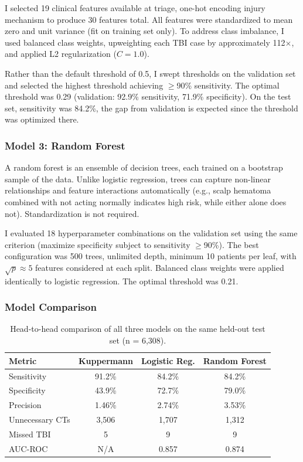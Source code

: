 \documentclass[11pt,letterpaper]{article}
\begin{document}
I selected 19 clinical features available at triage, one-hot encoding injury mechanism to produce 30 features total. All features were standardized to mean zero and unit variance (fit on training set only). To address class imbalance, I used balanced class weights, upweighting each TBI case by approximately 112$\times$, and applied L2 regularization ($C = 1.0$).

Rather than the default threshold of 0.5, I swept thresholds on the validation set and selected the highest threshold achieving $\geq$90\% sensitivity. The optimal threshold was 0.29 (validation: 92.9\% sensitivity, 71.9\% specificity). On the test set, sensitivity was 84.2\%, the gap from validation is expected since the threshold was optimized there.

\subsubsection{Model 3: Random Forest}

A random forest is an ensemble of decision trees, each trained on a bootstrap sample of the data. Unlike logistic regression, trees can capture non-linear relationships and feature interactions automatically (e.g., scalp hematoma combined with not acting normally indicates high risk, while either alone does not). Standardization is not required.

I evaluated 18 hyperparameter combinations on the validation set using the same criterion (maximize specificity subject to sensitivity $\geq$90\%). The best configuration was 500 trees, unlimited depth, minimum 10 patients per leaf, with $\sqrt{p} \approx 5$ features considered at each split. Balanced class weights were applied identically to logistic regression. The optimal threshold was 0.21.

\subsubsection{Model Comparison}

\begin{table}[H]
\centering
\caption{Head-to-head comparison of all three models on the same held-out test set (n = 6,308).}
\label{tab:model_comparison_final}
\small
\begin{tabular}{lccc}
\hline
\textbf{Metric} & \textbf{Kuppermann} & \textbf{Logistic Reg.} & \textbf{Random Forest} \\
\hline
Sensitivity       & 91.2\%    & 84.2\%  & 84.2\% \\
Specificity       & 43.9\%    & 72.7\%  & 79.0\% \\
Precision         & 1.46\%    & 2.74\%  & 3.53\% \\
Unnecessary CTs   & 3,506     & 1,707   & 1,312 \\
Missed TBI        & 5         & 9       & 9 \\
AUC-ROC           & N/A       & 0.857   & 0.874 \\
\hline
\end{tabular}
\end{table}
\end{document}

